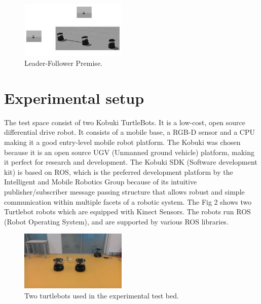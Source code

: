\documentclass[journal]{IEEEtran}
\begin{document}
\begin{enumerate}
\begin{figure}[!h]
\begin{center}
\includegraphics[width=2in]{1.jpeg}
\caption{Leader-Follower Premise.}
\end{center}
\label{fig:mypicture2}
\end{figure}




\end{enumerate}


\section{Experimental setup}

The test space consist of two Kobuki TurtleBots. It is a low-cost, open source differential drive robot. It consists of a mobile base, a RGB-D sensor and a CPU making it a good  entry-level mobile robot platform. The Kobuki was chosen because it is an open source UGV (Unmanned ground vehicle) platform, making it perfect for research and development. The Kobuki SDK (Software development kit) is based on ROS, which is the preferred development platform by the Intelligent and Mobile Robotics Group because of its intuitive publisher/subscriber message passing structure that allows robust and simple communication within multiple  facets of a robotic system. The Fig 2 shows two Turtlebot robots which are equipped with Kinect Sensors. The robots run ROS (Robot Operating System), and are supported by various ROS libraries. 

\begin{figure}[!h]
\begin{center}
\includegraphics[width=2in]{two.jpg}
\caption{Two turtlebots used in the experimental test bed.}
\end{center}
\label{fig:mypicture2}
\end{figure}
\end{document}
